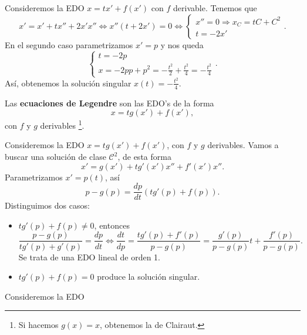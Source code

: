\begin{eg}
Consideremos la EDO $\displaystyle x = tx' + f\left(x'\right) $ con $\displaystyle f $ derivable. Tenemos que 
\[x' = x' + tx'' + 2x'x'' \iff x''\left(t+2x'\right)=0 \iff 
\begin{cases}
x'' = 0 \Rightarrow x_{C}= tC + C^{2} \\
t = -2x'
\end{cases}
.\]
En el segundo caso parametrizamos $\displaystyle x' = p $ y nos queda
\[ 
\begin{cases}
t = -2p \\
x = -2pp +p^{2}=-\frac{t ^{2}}{2}+\frac{t ^{2}}{4}=-\frac{t ^{2}}{4}
\end{cases}
.\]
Así, obtenemos la solución singular $\displaystyle x\left(t\right)=-\frac{t ^{2}}{4} $. 
\end{eg}
\begin{definition}
Las \textbf{ecuaciones de Legendre} son las EDO's de la forma
\[x=tg\left(x'\right) + f\left(x'\right) ,\]
con $\displaystyle f $ y $\displaystyle g $ derivables \footnote{Si hacemos $\displaystyle g\left(x\right)=x $, obtenemos la de Clairaut.}.
\end{definition}

\begin{observation}
Consideremos la EDO $\displaystyle x = tg\left(x'\right)+f\left(x'\right) $, con $\displaystyle f $ y $\displaystyle g $ derivables. Vamos a buscar una solución de clase $\displaystyle \mathcal{C}^{2} $, de esta forma
\[x' = g\left(x'\right)+tg'\left(x'\right)x'' + f'\left(x'\right)x'' .\]
Parametrizamos $\displaystyle x' = p\left(t\right) $, así
\[p -g\left(p\right)=\frac{dp}{dt}\left(tg'\left(p\right)+f\left(p\right)\right) .\]
Distinguimos dos casos:
\begin{itemize}
\item $\displaystyle tg'\left(p\right)+f\left(p\right)\neq 0 $, entonces
	\[\frac{p-g\left(p\right)}{tg'\left(p\right)+g'\left(p\right)} = \frac{dp}{dt} \iff \frac{dt}{dp} = \frac{tg'\left(p\right)+f'\left(p\right)}{p - g\left(p\right)} = \frac{g'\left(p\right)}{p - g\left(p\right)}t + \frac{f'\left(p\right)}{p - g\left(p\right)} .\]
	Se trata de una EDO lineal de orden 1. 
\item $\displaystyle tg'\left(p\right)+f\left(p\right)=0 $ produce la solución singular. 
\end{itemize}
\end{observation}
\begin{eg}
Consideremos la EDO 
\end{eg}

